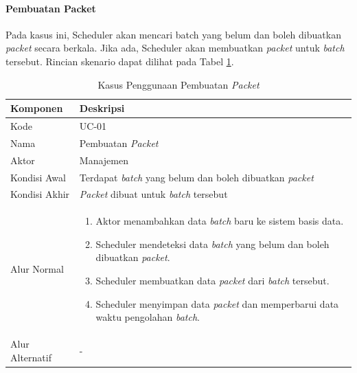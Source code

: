 \newcommand\tableUcDesc[8] {
\begin{longtable}{|p{2.5cm}|p{6.5cm}|}
	\caption{Kasus Penggunaan #3} \label{#1} \\ \hline
    \rowcolor{lightgray} Komponen & Deskripsi \\ \hline
    Kode & #2 \\ \hline
    Nama & #3 \\ \hline
    Aktor & #4 \\ \hline
    Kondisi Awal & #5 \\ \hline
    Kondisi Akhir & #6 \\ \hline
    Alur Normal & #7 \\ \hline
    Alur Alternatif & #8 \\ \hline
\end{longtable}
}

\paragraph{Pembuatan Packet}
\par Pada kasus ini, Scheduler akan mencari batch yang belum dan boleh dibuatkan \textit{packet} secara berkala. Jika ada, Scheduler akan membuatkan \textit{packet} untuk \textit{batch} tersebut. Rincian skenario dapat dilihat pada Tabel \ref{t:skenario_pembuatan_packet}.
\tableUcDesc
{t:skenario_pembuatan_packet}
{UC-01}
{Pembuatan \textit{Packet}}
{Manajemen}
{Terdapat \textit{batch} yang belum dan boleh dibuatkan \textit{packet}}
{\textit{Packet} dibuat untuk \textit{batch} tersebut}
{
\begin{enumerate}
	\item Aktor menambahkan data \textit{batch} baru ke sistem basis data.
    \item Scheduler mendeteksi data \textit{batch} yang belum dan boleh dibuatkan \textit{packet}.
    \item Scheduler membuatkan data \textit{packet} dari \textit{batch} tersebut.
    \item Scheduler menyimpan data \textit{packet} dan memperbarui data waktu pengolahan \textit{batch}.
\end{enumerate}
}
{-}

